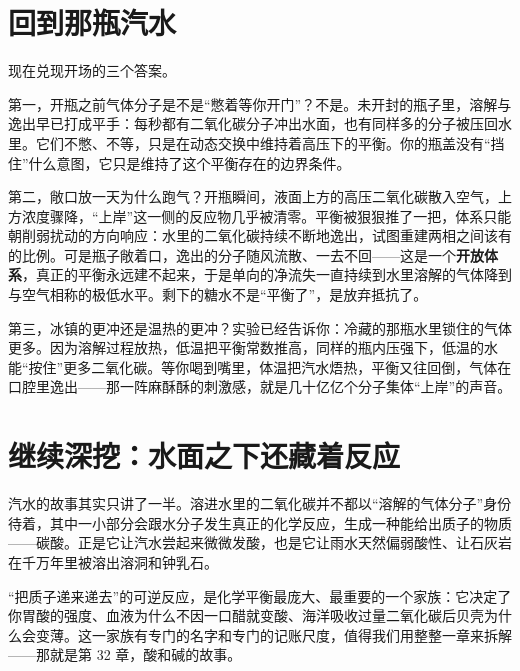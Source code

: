 \section{回到那瓶汽水}

现在兑现开场的三个答案。

第一，开瓶之前气体分子是不是“憋着等你开门”？不是。未开封的瓶子里，溶解与逸出早已打成平手：每秒都有二氧化碳分子冲出水面，也有同样多的分子被压回水里。它们不憋、不等，只是在动态交换中维持着高压下的平衡。你的瓶盖没有“挡住”什么意图，它只是维持了这个平衡存在的边界条件。

第二，敞口放一天为什么跑气？开瓶瞬间，液面上方的高压二氧化碳散入空气，上方浓度骤降，“上岸”这一侧的反应物几乎被清零。平衡被狠狠推了一把，体系只能朝削弱扰动的方向响应：水里的二氧化碳持续不断地逸出，试图重建两相之间该有的比例。可是瓶子敞着口，逸出的分子随风流散、一去不回——这是一个\textbf{开放体系}，真正的平衡永远建不起来，于是单向的净流失一直持续到水里溶解的气体降到与空气相称的极低水平。剩下的糖水不是“平衡了”，是放弃抵抗了。

第三，冰镇的更冲还是温热的更冲？实验已经告诉你：冷藏的那瓶水里锁住的气体更多。因为溶解过程放热，低温把平衡常数推高，同样的瓶内压强下，低温的水能“按住”更多二氧化碳。等你喝到嘴里，体温把汽水焐热，平衡又往回倒，气体在口腔里逸出——那一阵麻酥酥的刺激感，就是几十亿亿个分子集体“上岸”的声音。

\section{继续深挖：水面之下还藏着反应}

汽水的故事其实只讲了一半。溶进水里的二氧化碳并不都以“溶解的气体分子”身份待着，其中一小部分会跟水分子发生真正的化学反应，生成一种能给出质子的物质——碳酸。正是它让汽水尝起来微微发酸，也是它让雨水天然偏弱酸性、让石灰岩在千万年里被溶出溶洞和钟乳石。

“把质子递来递去”的可逆反应，是化学平衡最庞大、最重要的一个家族：它决定了你胃酸的强度、血液为什么不因一口醋就变酸、海洋吸收过量二氧化碳后贝壳为什么会变薄。这一家族有专门的名字和专门的记账尺度，值得我们用整整一章来拆解——那就是第 32 章，酸和碱的故事。


